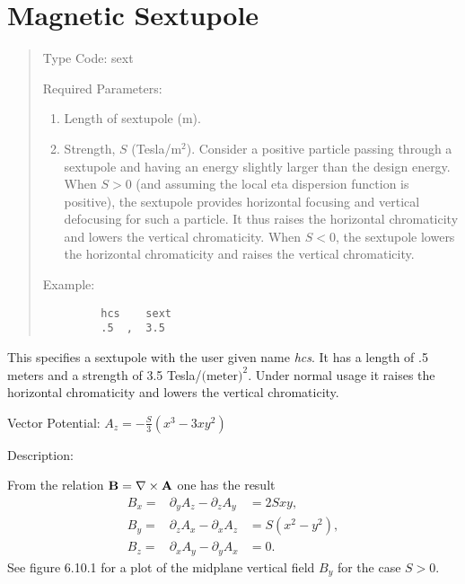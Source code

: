 \section{Magnetic Sextupole}
\begin{quotation}
\noindent Type Code:  sext
\vspace{5mm}

\noindent Required Parameters:
\begin{enumerate}
      \item  Length of sextupole (m).
      \item  Strength, $S$ (Tesla/$\mbox{m}^2$).  Consider a positive
particle passing through a sextupole and having an energy
             slightly larger than the design energy.  When $S > 0$ (and
             assuming the local eta dispersion function is positive), the
             sextupole provides horizontal focusing and vertical defocusing
             for such a particle.  It thus raises the horizontal
             chromaticity and lowers the vertical chromaticity.  When $S < 0$,
             the sextupole lowers the horizontal chromaticity and raises
             the vertical chromaticity.
\end{enumerate}

\vspace{5mm}
\noindent     Example:
\begin{verbatim}
         hcs    sext
         .5  ,  3.5
\end{verbatim}
\end{quotation}
This specifies a sextupole with the user given name {\em hcs}.  It has a length
of .5 meters and a strength of 3.5 Tesla/$\mbox{(meter)}^2$.  Under
normal usage it raises the
horizontal chromaticity and lowers the vertical chromaticity.

\vspace{5mm}
   Vector Potential:  $\displaystyle A_z  = - \frac{S}{3}(x^3 - 3xy^2)$

\vspace{5mm}
     Description:
\vspace{2mm}

    From the relation ${\bf B} = \nabla \times {\bf A}$ one has the result
\begin{eqnarray*}
B_x= & \partial_y A_z - \partial_z A_y &= 2Sxy,\\
B_y= & \partial_z A_x - \partial_x A_z &= S(x^2-y^2),\\
B_z= & \partial_x A_y - \partial_y A_x &= 0.
\end{eqnarray*}
See figure 6.10.1 for a plot of the midplane vertical field $B_y$ for the case $S>0$.

